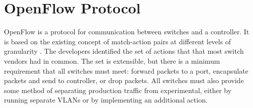 \chapter{OpenFlow Protocol}
OpenFlow \cite{onf:switch140} is a protocol for communication between switches and a controller. It is based on the existing concept of match-action pairs at different levels of granularity \cite{mckeown:sdn}. The developers identified the set of actions that that most switch vendors had in common. The set is extensible, but there is a minimum requirement that all switches must meet: forward packets to a port, encapsulate packets and send to controller, or drop packets. All switches must also provide some method of separating production traffic from experimental, either by running separate VLANs or by implementing an additional action.
